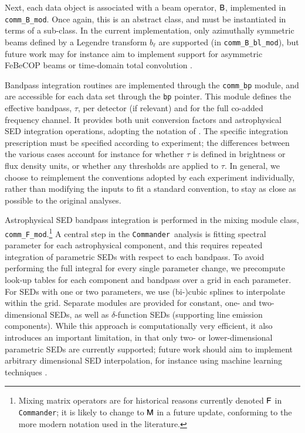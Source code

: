 \documentclass[twocolumn]{aa}
\def\commander{\texttt{Commander}}
\newcommand{\F}[0]{\tens{F}}
\newcommand{\B}[0]{\tens{B}}
\newcommand{\M}[0]{\tens{M}}
\begin{document}
Next, each data object is associated with a beam operator, $\B$,
implemented in \texttt{comm\_B\_mod}. Once again, this is an abstract
class, and must be instantiated in terms of a sub-class. In the
current implementation, only azimuthally symmetric beams defined by a
Legendre transform $b_{\ell}$ are supported (in
\texttt{comm\_B\_bl\_mod}), but future work may for instance aim to
implement support for asymmetric FeBeCOP beams \citep{mitra2010} or
time-domain total convolution \citep{Wandelt:2001,BP08}.

Bandpass integration routines are implemented through the
\texttt{comm\_bp} module, and are accessible for each data set through
the \texttt{bp} pointer. This module defines the effective bandpass,
$\tau$, per detector (if relevant) and for the full co-added frequency
channel. It provides both unit conversion factors and astrophysical
SED integration operations, adopting the notation of
\citet{planck2013-p03d,BP09}. The specific integration prescription
must be specified according to experiment; the differences between the
various cases account for instance for whether $\tau$ is defined in brightness
or flux density units, or whether any thresholds are applied to
$\tau$. In general, we choose to reimplement the conventions adopted
by each experiment individually, rather than modifying the inputs to
fit a standard convention, to stay as close as possible to the
original analyses.

Astrophysical SED bandpass integration is performed in the mixing
module class, \texttt{comm\_F\_mod}.\footnote{Mixing matrix operators
  are for historical reasons currently denoted $\F$ in \commander; it
  is likely to change to $\M$ in a future update, conforming to the more
  modern notation used in the literature.} A central step in
the \commander\ analysis is fitting spectral parameter for each
astrophysical component, and this requires repeated integration of
parametric SEDs with respect to each bandpass. To avoid performing the
full integral for every single parameter change, we precompute look-up
tables for each component and bandpass over a grid in each
parameter. For SEDs with one or two parameters, we use (bi-)cubic
splines to interpolate within the grid. Separate modules are provided
for constant, one- and two-dimensional SEDs, as well as
$\delta$-function SEDs (supporting line emission components). While
this approach is computationally very efficient, it also introduces an
important limitation, in that only two- or lower-dimensional
parametric SEDs are currently supported; future work should aim to
implement arbitrary dimensional SED interpolation, for instance using
machine learning techniques \citep[e.g.,][]{fendt:2007}.
\end{document}
